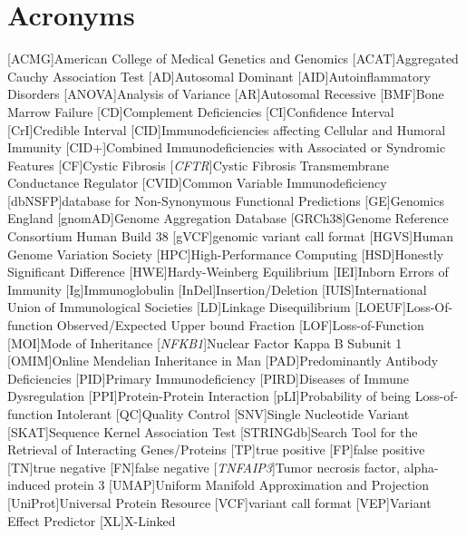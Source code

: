 \clearpage

\section*{Acronyms}
\renewenvironment{description}%
  {\list{}{\labelwidth0pt\itemindent-\leftmargin
    \parsep-1em\itemsep0pt\let\makelabel\descriptionlabel}}
  {\endlist}
\begin{acronym}
 [ACMG]{American College of Medical Genetics and Genomics}
 [ACAT]{Aggregated Cauchy Association Test}
 [AD]{Autosomal Dominant}
 [AID]{Autoinflammatory Disorders}
 [ANOVA]{Analysis of Variance}
 [AR]{Autosomal Recessive}
 [BMF]{Bone Marrow Failure}
 [CD]{Complement Deficiencies}
 [CI]{Confidence Interval}
 [CrI]{Credible Interval}
 [CID]{Immunodeficiencies affecting Cellular and Humoral Immunity}
 [CID+]{Combined Immunodeficiencies with Associated or Syndromic Features}
 [CF]{Cystic Fibrosis}
 [\textit{CFTR}]{Cystic Fibrosis Transmembrane Conductance Regulator}
 [CVID]{Common Variable Immunodeficiency}
 [dbNSFP]{database for Non-Synonymous Functional Predictions}
 [GE]{Genomics England} 
 [gnomAD]{Genome Aggregation Database}
 [GRCh38]{Genome Reference Consortium Human Build 38}
[gVCF]{genomic variant call format}
 [HGVS]{Human Genome Variation Society}
 [HPC]{High-Performance Computing}
  [HSD]{Honestly Significant Difference}
 [HWE]{Hardy-Weinberg Equilibrium}
 [IEI]{Inborn Errors of Immunity}
  [Ig]{Immunoglobulin}
 [InDel]{Insertion/Deletion}
 [IUIS]{International Union of Immunological Societies}
 [LD]{Linkage Disequilibrium}
 [LOEUF]{Loss-Of-function Observed/Expected Upper bound Fraction}
  [LOF]{Loss-of-Function}
 [MOI]{Mode of Inheritance}
 [\textit{NFKB1}]{Nuclear Factor Kappa B Subunit 1}
 [OMIM]{Online Mendelian Inheritance in Man}
 [PAD]{Predominantly Antibody Deficiencies}
 [PID]{Primary Immunodeficiency}
 [PIRD]{Diseases of Immune Dysregulation}
 [PPI]{Protein-Protein Interaction}
 [pLI]{Probability of being Loss-of-function Intolerant}
 [QC]{Quality Control}
 [SNV]{Single Nucleotide Variant}
 [SKAT]{Sequence Kernel Association Test}
 [STRINGdb]{Search Tool for the Retrieval of Interacting Genes/Proteins}
 [TP]{true positive}
[FP]{false positive}
[TN]{true negative}
[FN]{false negative}
[\textit{TNFAIP3}]{Tumor necrosis factor, alpha-induced protein 3}
 [UMAP]{Uniform Manifold Approximation and Projection}
 [UniProt]{Universal Protein Resource}
  [VCF]{variant call format}
 [VEP]{Variant Effect Predictor}
 [XL]{X-Linked}
\end{acronym}


